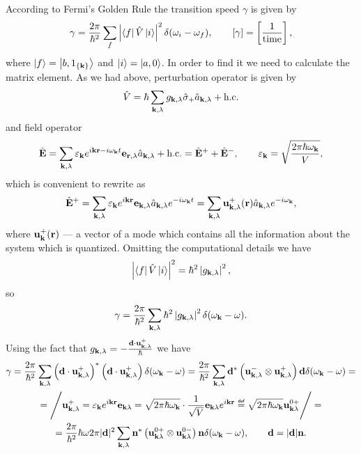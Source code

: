 According to Fermi's Golden Rule the transition speed $\gamma$ is given by
\begin{equation}
	\gamma = \frac{2\pi}{\hbar^2} \sum_{f} \left| \left\langle {f} \right\rvert \hat{V} \left\lvert {i} \right\rangle \right|^2 \delta(\omega_i - \omega_f),	\qquad \left[\gamma\right] = \left[\frac{1}{\text{time}}\right],
\end{equation}
where $\left\lvert {f} \right\rangle =\left\lvert {b, 1_{\left\{ \mathbf{k}\right\}}} \right\rangle$ and $\left\lvert {i} \right\rangle = \left\lvert {a,0} \right\rangle$. In order to find it we need to calculate the matrix element. As we had above, perturbation operator is given by
\begin{equation}
	\hat{V} = \hbar \sum_{\mathbf{k}, \lambda} g_{\mathbf{k}, \lambda} \hat{\sigma}_+ \hat{a}_{\mathbf{k}, \lambda} + \text{h.c.}
\end{equation}
and field operator
\begin{equation}
	\hat{\mathbf{E}} = \sum_{\mathbf{k}, \lambda} \varepsilon_{\mathbf{k}} e^{i \mathbf{k} \mathbf{r} - i \omega_{\mathbf{k}}t} \mathbf{e}_{\mathbf{r}, \lambda} \hat{a}_{\mathbf{k}, \lambda} + \text{h.c.} = \hat{\mathbf{E}}^+ + \hat{\mathbf{E}}^-, \qquad \varepsilon_{\mathbf{k}} = \sqrt{\frac{2 \pi \hbar \omega_{\mathbf{k}}}{V}},
\end{equation}
which is convenient to rewrite as
\begin{equation}
	\hat{\mathbf{E}}^+ = \sum_{\mathbf{k}, \lambda} \varepsilon_{\mathbf{k}} e^{i\mathbf{k} \mathbf{r}} \mathbf{e}_{\mathbf{k} , \lambda} \hat{a}_{\mathbf{k}, \lambda} e^{-i\omega_{\mathbf{k}} t} = \sum_{\mathbf{k}, \lambda} \mathbf{u}_{\mathbf{k}, \lambda}^+(\mathbf{r}) \hat{a}_{\mathbf{k}, \lambda} e^{-i\omega_{\mathbf{k}}},
\end{equation}
where $\mathbf{u}_{\mathbf{k}}^+(\mathbf{r})$ --- a vector of a mode which contains all the information about the system which is quantized. Omitting the computational details we have
\begin{equation}
	\left| \left\langle {f} \right\rvert \hat{V} \left\lvert {i} \right\rangle \right|^2 =  \hbar^2 \left| g_{\mathbf{k}, \lambda} \right|^2 ,
\end{equation}
so
\begin{equation}
	\gamma = \frac{2\pi}{\hbar^2} \sum_{\mathbf{k}, \lambda} \hbar^2 \left| g_{\mathbf{k}, \lambda} \right|^2 \delta(\omega_{\mathbf{k}} - \omega).
\end{equation}
Using the fact that $g_{\mathbf{k}, \lambda} = - \frac{\mathbf{d} \cdot \mathbf{u}^+_{\mathbf{k}, \lambda}}{\hbar}$ we have
\begin{multline}
	\gamma = \frac{2\pi}{\hbar^2} \sum_{\kv, \lambda} \left( \vec{d} \cdot \vec{u}_{\kv, \lambda}^+ \right)^* \left( \vec{d} \cdot \vec{u}_{\kv, \lambda}^+ \right) \delta(\omega_{\kv} - \omega) = \frac{2\pi}{\hbar^2} \sum_{\kv, \lambda} \vec{d}^* \left(\vec{u}_{\kv, \lambda}^- \otimes  \vec{u}_{\kv, \lambda}^+ \right) \vec{d} \delta(\omega_{\kv} - \omega)= \\ =
	\Bigg/ \vec{u}^+_{\vec{k}, \lambda} = \varepsilon_{\kv} e^{i \vec{k} \vec{r}} \vec{e}_{\kv \lambda} =  \sqrt{2\pi \hbar \omega_{\kv}} \cdot \frac{1}{\sqrt{V}} \vec{e}_{\kv \lambda} e^{i \kv \vec{r}} \myeq \sqrt{2\pi \hbar \omega_{\kv}} \vec{u}^{0+}_{\kv \lambda} \Bigg/ =  \\ = \frac{2\pi}{\hbar^2} \hbar \omega 2 \pi  |\vec{d}|^2 \sum_{\kv, \lambda} \vec{n}^* \left( \vec{u}^{0+}_{\kv \lambda} \otimes \vec{u}^{0-}_{\kv \lambda} \right) \vec{n} \delta (\omega_{\kv} - \omega) , \qquad \vec{d} = |\vec{d}| \vec{n}.
\end{multline}

